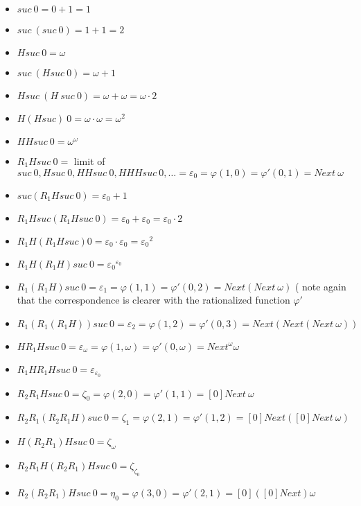 \documentclass[10pt]{article}
\begin{document}
\begin{itemize}
     \setlength{\itemsep}{1pt}
     \setlength{\parskip}{0pt}
     \setlength{\parsep}{0pt}

\item \( suc\ 0 = 0 + 1 = 1 \)
\item \( suc\ (suc\ 0) = 1 + 1 = 2 \)
\item \( H suc\ 0 = \omega \)
\item \( suc\ (H suc\ 0) = \omega + 1 \)
\item \( H suc\ (H\ suc\ 0) = \omega + \omega = \omega \cdot 2 \)
\item \( H (H suc)\ 0 = \omega \cdot \omega = \omega^2 \)
\item \( H H suc\ 0 = \omega^\omega \)
\item \( R_1 H suc\ 0 = \) limit of \( suc\ 0, H suc\ 0, H H suc\ 0, H H H suc\ 0, \ldots = \varepsilon_0 = \varphi(1,0) = \varphi'(0,1) = Next\ \omega \)
\item \( suc (R_1 H suc\ 0) = \varepsilon_0 + 1 \)
\item \( R_1 H suc (R_1 H suc\ 0) = \varepsilon_0 + \varepsilon_0 = \varepsilon_0 \cdot 2 \)
\item \( R_1 H (R_1 H suc) 0 = \varepsilon_0 \cdot \varepsilon_0 = {\varepsilon_0}^2 \)
\item \( R_1 H (R_1 H) suc\ 0 = {\varepsilon_0}^{\varepsilon_0} \)
\item \( R_1 (R_1 H) suc\ 0 = \varepsilon_1 = \varphi(1,1) = \varphi'(0,2) = Next (Next\ \omega) \) ( note again that the correspondence is clearer with the rationalized function \( \varphi' \)
\item \( R_1 (R_1 (R_1 H)) suc\ 0 = \varepsilon_2 = \varphi(1,2) = \varphi'(0,3) = Next (Next (Next\ \omega)) \)
\item \( H R_1 H suc\ 0 = \varepsilon_\omega = \varphi(1,\omega) = \varphi'(0,\omega) = Next^\omega \omega \)
\item \( R_1 H R_1 H suc\ 0 = \varepsilon_{\varepsilon_0} \)
\item \( R_2 R_1 H suc\ 0 = \zeta_0 = \varphi(2,0) = \varphi'(1,1) = [0] Next\ \omega \)
\item \( R_2 R_1 (R_2 R_1 H) suc\ 0 = \zeta_1 = \varphi(2,1) = \varphi'(1,2) = [0] Next ([0] Next\ \omega) \)
\item \( H (R_2 R_1) H suc\ 0 = \zeta_\omega \)
\item \( R_2 R_1 H (R_2 R_1) H suc\ 0 = \zeta_{\zeta_0} \)
\item \( R_2 (R_2 R_1) H suc\ 0 = \eta_0 = \varphi(3,0) = \varphi'(2,1) = [0] ([0] Next) \omega \)

\end{itemize}
\end{document}
